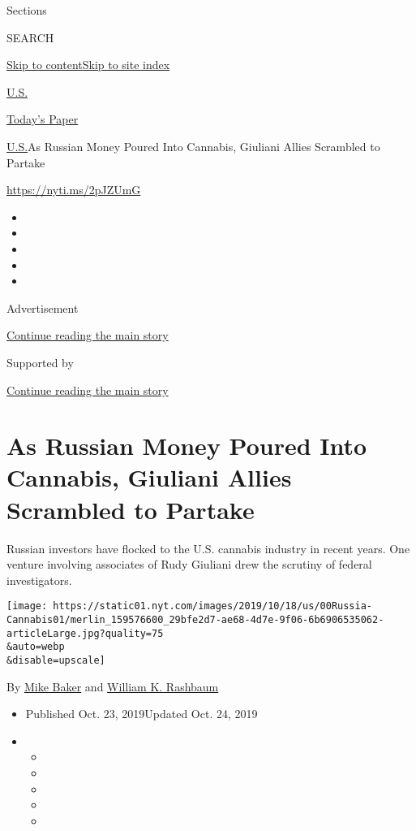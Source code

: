 Sections

SEARCH

\protect\hyperlink{site-content}{Skip to
content}\protect\hyperlink{site-index}{Skip to site index}

\href{https://www.nytimes.com/section/us}{U.S.}

\href{https://myaccount.nytimes.com/auth/login?response_type=cookie\&client_id=vi}{}

\href{https://www.nytimes.com/section/todayspaper}{Today's Paper}

\href{/section/us}{U.S.}\textbar{}As Russian Money Poured Into Cannabis,
Giuliani Allies Scrambled to Partake

\url{https://nyti.ms/2pJZUmG}

\begin{itemize}
\item
\item
\item
\item
\item
\end{itemize}

Advertisement

\protect\hyperlink{after-top}{Continue reading the main story}

Supported by

\protect\hyperlink{after-sponsor}{Continue reading the main story}

\hypertarget{as-russian-money-poured-into-cannabis-giuliani-allies-scrambled-to-partake}{%
\section{As Russian Money Poured Into Cannabis, Giuliani Allies
Scrambled to
Partake}\label{as-russian-money-poured-into-cannabis-giuliani-allies-scrambled-to-partake}}

Russian investors have flocked to the U.S. cannabis industry in recent
years. One venture involving associates of Rudy Giuliani drew the
scrutiny of federal investigators.

\texttt{[image: https://static01.nyt.com/images/2019/10/18/us/00Russia-Cannabis01/merlin\_159576600\_29bfe2d7-ae68-4d7e-9f06-6b6906535062-articleLarge.jpg?quality=75\\\&auto=webp\\\&disable=upscale]}

By \href{https://www.nytimes.com/by/mike-baker}{Mike Baker} and
\href{https://www.nytimes.com/by/william-k-rashbaum}{William K.
Rashbaum}

\begin{itemize}
\item
  Published Oct. 23, 2019Updated Oct. 24, 2019
\item
  \begin{itemize}
  \item
  \item
  \item
  \item
  \item
  \end{itemize}
\end{itemize}

